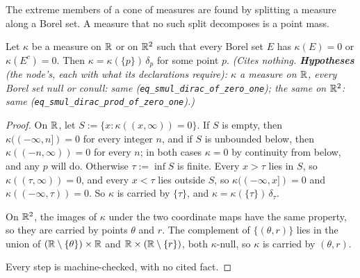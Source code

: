 The extreme members of a cone of measures are found by splitting a measure along a Borel set. A
measure that no such split decomposes is a point mass.

\begin{lemma}
\label{lem:null-conull-point-mass}
\leanok
Let $\kappa$ be a measure on $\mathbb{R}$ or on $\mathbb{R}^2$ such that every Borel set $E$ has $\kappa(E) = 0$
or $\kappa(E^c) = 0$. Then $\kappa = \kappa(\{p\})\,\delta_p$ for some point $p$.
\statusT\quad\emph{(Cites nothing. \textbf{Hypotheses} (the node's, each with what its declarations
require): $\kappa$ a measure on $\mathbb{R}$, every Borel set null or conull: same
(\texttt{eq\_smul\_dirac\_of\_zero\_one}); the same on $\mathbb{R}^2$: same
(\texttt{eq\_smul\_dirac\_prod\_of\_zero\_one}).)}
\end{lemma}

\begin{proof}
\leanok
On $\mathbb{R}$, let $S := \{x : \kappa((x,\infty)) = 0\}$. If $S$ is empty, then
$\kappa((-\infty, n]) = 0$ for every integer $n$, and if $S$ is unbounded below, then
$\kappa((-n,\infty)) = 0$ for every $n$; in both cases $\kappa = 0$ by continuity from below, and
any $p$ will do. Otherwise $\tau := \inf S$ is finite. Every $x > \tau$ lies in $S$, so
$\kappa((\tau,\infty)) = 0$, and every $x < \tau$ lies outside $S$, so $\kappa((-\infty,x]) = 0$ and
$\kappa((-\infty,\tau)) = 0$. So $\kappa$ is carried by $\{\tau\}$, and $\kappa = \kappa(\{\tau\})\,
\delta_\tau$.

On $\mathbb{R}^2$, the images of $\kappa$ under the two coordinate maps have the same property, so they are
carried by points $\theta$ and $r$. The complement of $\{(\theta, r)\}$ lies in the union of
$(\mathbb{R} \setminus \{\theta\}) \times \mathbb{R}$ and $\mathbb{R} \times (\mathbb{R} \setminus \{r\})$, both $\kappa$-null,
so $\kappa$ is carried by $(\theta, r)$.

Every step is machine-checked, with no cited fact.
\end{proof}

